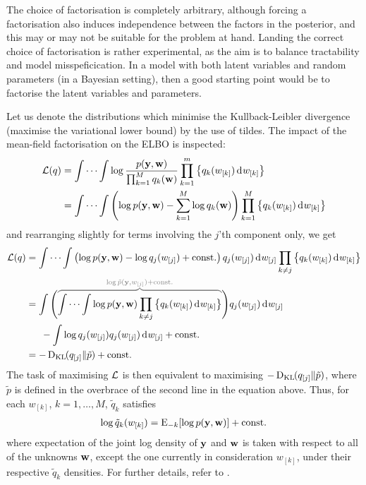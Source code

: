 \begin{remark}
The choice of factorisation is completely arbitrary, although forcing a factorisation also induces independence between the factors in the posterior, and this may or may not be suitable for the problem at hand.
Landing the correct choice of factorisation is rather experimental, as the aim is to balance tractability and model misspeficication.
In a model with both latent variables and random parameters (in a Bayesian setting), then a good starting point would be to factorise the latent variables and parameters.
\end{remark}

Let us denote the distributions which minimise the Kullback-Leibler divergence (maximise the variational lower bound) by the use of tildes.
The impact of the mean-field factorisation on the ELBO is inspected:
\begin{align*}
  {\mathcal L}(q) 
  &= \idotsint \log \frac{p({\mathbf y},{\mathbf w})}{\prod_{k=1}^M q_k({\mathbf w})}  \prod_{k=1}^m \left\{ q_k(w_{[k]}) \operatorname{d}\hspace{0.5pt}\! w_{[k]} \right\} \\
  &= \idotsint \left( \log p({\mathbf y},{\mathbf w}) - \sum_{k=1}^M \log q_k({\mathbf w})  \right) \prod_{k=1}^M \left\{ q_k(w_{[k]}) \operatorname{d}\hspace{0.5pt}\! w_{[k]} \right\} 
\end{align*}
and rearranging slightly for terms involving the $j$'th component only, we get
\begin{align*}
  \cL(q) 
  &= \idotsint \left( \log p(\by,\bw)  - \log q_j(w_{[j]}) + \const \right) q_j(w_{[j]}) \dint w_{[j]} \prod_{k\neq j} \left\{ q_k(w_{[k]}) \dint w_{[k]} \right\} \\
  &= \int \Bigg( 
  \greyoverbrace{\idotsint \log p(\by,\bw)  \prod_{k\neq j} \left\{ q_k(w_{[k]}) \dint w_{[k]} \right\}}{\log \tilde p(\by,w_{[j]}) + \const}
  \Bigg) q_j(w_{[j]}) \dint w_{[j]} \\
  &\phantom{==} - \int  \log q_j(w_{[j]}) q_j(w_{[j]}) \dint w_{[j]} + \const \\
  &= -\KL(q_{[j]} \Vert \tilde p) + \const
\end{align*}
The task of maximising ${\mathcal L}$ is then equivalent to maximising $-\operatorname{D_{KL}\hspace{-1pt}}(q_{[j]} \Vert \tilde p)$, where $\tilde p$ is defined in the overbrace of the second line in the equation above.
Thus, for each $w_{[k]}$, $k=1,\dots,M$, $\tilde q_k$ satisfies
\begin{align}\label{eq:qtilde}
  \log \tilde q_k(w_{[k]}) = \operatorname{E}_{-k} [ \log p({\mathbf y},{\mathbf w}) ] + \text{const.}\hspace{0.01em}
\end{align}
where expectation of the joint log density of ${\mathbf y}$ and ${\mathbf w}$ is taken with respect to all of the unknowns ${\mathbf w}$, except the one currently in consideration $w_{[k]}$, under their respective $\tilde q_k$ densities. 
For further details, refer to \citet[eq. 10.9, p. 466]{bishop2006pattern}.

